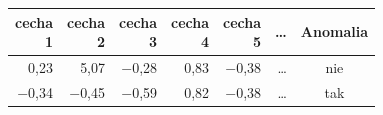 \begin{tabular}{rrrrrrc}
\toprule
\makecell{cecha\\1} & \makecell{cecha\\2} & \makecell{cecha\\3} & \makecell{cecha\\4} & \makecell{cecha\\5} & \dots & Anomalia \\
\midrule
0,23 & 5,07 & $-$0,28 & 0,83 & $-$0,38 & \dots & nie \\
$-$0,34 & $-$0,45 & $-$0,59 & 0,82 & $-$0,38 & \dots & tak \\
\bottomrule
\end{tabular}

